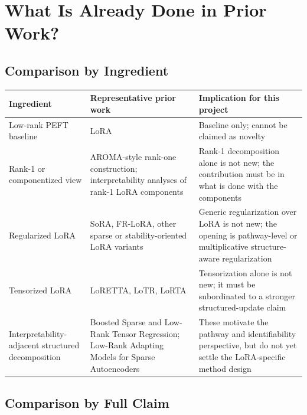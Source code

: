 \documentclass[11pt]{article}
\begin{document}
\section{What Is Already Done in Prior Work?}

\subsection{Comparison by Ingredient}

\begin{center}
\renewcommand{\arraystretch}{1.25}
\begin{tabular}{|>{\raggedright\arraybackslash}p{2.8cm}|>{\raggedright\arraybackslash}p{4.4cm}|>{\raggedright\arraybackslash}p{5.1cm}|}
\hline
\textbf{Ingredient} & \textbf{Representative prior work} & \textbf{Implication for this project} \\
\hline
Low-rank PEFT baseline & LoRA & Baseline only; cannot be claimed as novelty \\
\hline
Rank-1 or componentized view & AROMA-style rank-one construction; interpretability analyses of rank-1 LoRA components & Rank-1 decomposition alone is not new; the contribution must be in what is done with the components \\
\hline
Regularized LoRA & SoRA, FR-LoRA, other sparse or stability-oriented LoRA variants & Generic regularization over LoRA is not new; the opening is pathway-level or multiplicative structure-aware regularization \\
\hline
Tensorized LoRA & LoRETTA, LoTR, LoRTA & Tensorization alone is not new; it must be subordinated to a stronger structured-update claim \\
\hline
Interpretability-adjacent structured decomposition & Boosted Sparse and Low-Rank Tensor Regression; Low-Rank Adapting Models for Sparse Autoencoders & These motivate the pathway and identifiability perspective, but do not yet settle the LoRA-specific method design \\
\hline
\end{tabular}
\end{center}

\subsection{Comparison by Full Claim}
\end{document}
